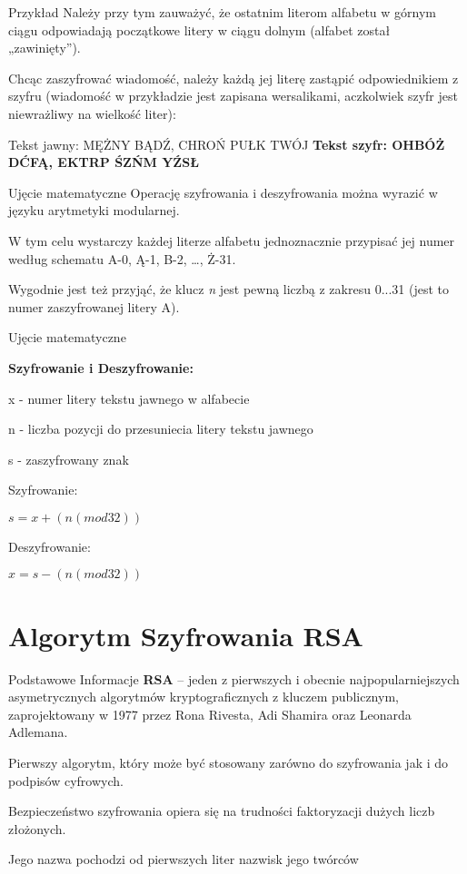 \documentclass[10pt]{beamer}
\begin{document}
\begin{frame}{Przykład}
	Należy przy tym zauważyć, że ostatnim literom alfabetu w górnym ciągu odpowiadają początkowe litery w ciągu dolnym (alfabet został „zawinięty”).
	
	 Chcąc zaszyfrować wiadomość, należy każdą jej literę zastąpić odpowiednikiem z szyfru (wiadomość w przykładzie jest zapisana wersalikami, aczkolwiek szyfr jest niewrażliwy na wielkość liter):


\begin{block}{Tekst jawny: MĘŻNY BĄDŹ, CHROŃ PUŁK TWÓJ}
      \textbf{Tekst szyfr: OHBÓŻ DĆFĄ, EKTRP ŚZŃM YŹSŁ}
      \end{block}
\end{frame}




\begin{frame}{Ujęcie matematyczne}
	Operację szyfrowania i deszyfrowania można wyrazić w języku arytmetyki modularnej.
	
	 W tym celu wystarczy każdej literze alfabetu jednoznacznie przypisać jej numer według schematu A-0, Ą-1, B-2, …, Ż-31.
	
	 Wygodnie jest też przyjąć, że klucz \textit{n} jest pewną liczbą z zakresu 0...31 (jest to numer zaszyfrowanej litery A).
\end{frame}

\begin{frame}{Ujęcie matematyczne}

	\textbf{Szyfrowanie i Deszyfrowanie:}
	
	x - numer litery tekstu jawnego w alfabecie
	
	n - liczba pozycji do przesuniecia litery tekstu jawnego
	
	s - zaszyfrowany znak
	
	Szyfrowanie:
	
	$s = x + (n (mod 32))$
	
	Deszyfrowanie:
	
	$x = s - (n (mod 32))$
	
	
\end{frame}

\section{Algorytm Szyfrowania RSA}

\begin{frame}[fragile]{Podstawowe Informacje}
      \textbf{RSA} – jeden z pierwszych i obecnie najpopularniejszych asymetrycznych algorytmów kryptograficznych z kluczem publicznym, zaprojektowany w 1977 przez Rona Rivesta, Adi Shamira oraz Leonarda Adlemana.
      
       Pierwszy algorytm, który może być stosowany zarówno do szyfrowania jak i do podpisów cyfrowych.
       
       Bezpieczeństwo szyfrowania opiera się na trudności faktoryzacji dużych liczb złożonych.
       
        Jego nazwa pochodzi od pierwszych liter nazwisk jego twórców
\end{frame}
\end{document}
